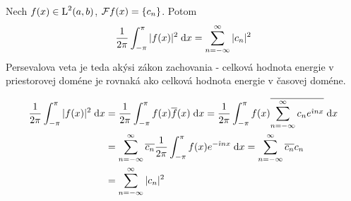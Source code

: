 \begin{veta}
 Nech $f(x) \in \mbox{L}^2(a,b)$, $\mathcal{F} f(x) = \{ c_n\}$. Potom
 \begin{equation*}
   \frac{1}{2\pi} \int_{-\pi}^{\pi} |f(x)|^2 \; \mathrm{d} x = \sum_{n=-\infty}^{\infty} |c_n|^2
 \end{equation*}
 Persevalova veta je teda akýsi zákon zachovania - celková hodnota
 energie v priestorovej doméne je rovnaká ako celková hodnota energie
 v časovej doméne.
\end{veta}
\begin{dokaz}
    \begin{equation*}
    \begin{split}
        \frac{1}{2\pi} \int_{-\pi}^{\pi} |f(x)|^2 \; \mathrm{d} x 
          &= \frac{1}{2\pi} \int_{-\pi}^{\pi} f(x) \overline{f}(x) \; \mathrm{d} x 
           = \frac{1}{2\pi} \int_{-\pi}^{\pi} f(x) 
            \overline{ \sum_{n=-\infty}^{\infty} c_n e^{\hat{\imath} n x} } \; \mathrm{d} x \\
          &= \sum_{n=-\infty}^{\infty} \overline{c_n} \frac{1}{2\pi}
                \int_{-\pi}^{\pi} f(x) e^{-\hat{\imath} n x} \; \mathrm{d} x
            = \sum_{n=-\infty}^{\infty} \overline{c_n} c_n \\
          &= \sum_{n=-\infty}^{\infty} |c_n|^2
    \end{split}
    \end{equation*}
\end{dokaz}

\nocite{properties_series}
\nocite{bracewell}
